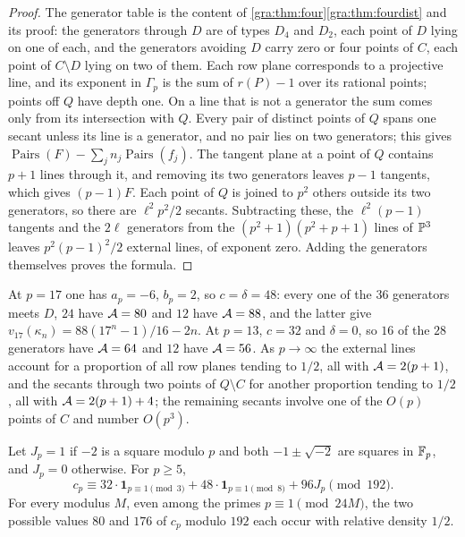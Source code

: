 \begin{proof}
The generator table is the content of \cref{gra:thm:four}\ref{gra:thm:fourdist} and its
proof: the generators through $D$ are of types $D_4$ and $D_2$, each point
of $D$ lying on one of each, and the generators avoiding $D$ carry zero or
four points of $C$, each point of $C\setminus D$ lying on two of them. Each
row plane corresponds to a projective line, and its exponent in $\Gamma_p$
is the sum of $r(P)-1$ over its rational points; points off $Q$ have depth
one. On a line that is not a generator the sum comes only from its
intersection with $Q$. Every pair of distinct points of $Q$ spans one
secant unless its line is a generator, and no pair lies on two generators;
this gives $\operatorname{Pairs}(F)-\sum_jn_j\operatorname{Pairs}(f_j)$. The
tangent plane at a point of $Q$ contains $p+1$ lines through it, and
removing its two generators leaves $p-1$ tangents, which gives $(p-1)F$.
Each point of $Q$ is joined to $p^2$ others outside its two generators, so
there are $\ell^2p^2/2$ secants. Subtracting these, the $\ell^2(p-1)$
tangents and the $2\ell$ generators from the $(p^2+1)(p^2+p+1)$ lines of
$\mathbb{P}^3$ leaves $p^2(p-1)^2/2$ external lines, of exponent zero. Adding
the generators themselves proves the formula.
\end{proof}

At $p=17$ one has $a_p=-6$, $b_p=2$, so $c=\delta=48$: every one of the
$36$ generators meets $D$, $24$ have $\mathcal{A}=80$ and $12$ have $\mathcal{A}=88$,
and the latter give $v_{17}(\kappa_n)=88(17^n-1)/16-2n$. At $p=13$,
$c=32$ and $\delta=0$, so $16$ of the $28$ generators have $\mathcal{A}=64$ and
$12$ have $\mathcal{A}=56$. As $p\to\infty$ the external lines account for a
proportion of all row planes tending to $1/2$, all with $\mathcal{A}=2(p+1)$, and
the secants through two points of $Q\setminus C$ for another proportion
tending to $1/2$, all with $\mathcal{A}=2(p+1)+4$; the remaining secants involve
one of the $O(p)$ points of $C$ and number $O(p^3)$.

\begin{theorem}\label{gra:thm:c192}
Let $J_p=1$ if $-2$ is a square modulo $p$ and both $-1\pm\sqrt{-2}$ are
squares in $\mathbb{F}_p$, and $J_p=0$ otherwise. For $p\ge5$,
\[
 c_p\equiv32\cdot\mathbf 1_{p\equiv1\pmod3}+48\cdot\mathbf 1_{p\equiv1\pmod8}
 +96J_p\pmod{192}.
\]
For every modulus $M$, even among the primes $p\equiv1\pmod{24M}$, the two
possible values $80$ and $176$ of $c_p$ modulo $192$ each occur with
relative density $1/2$.
\end{theorem}

